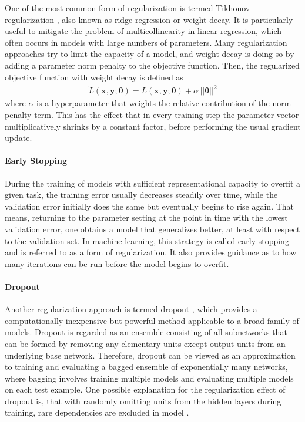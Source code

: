 \documentclass{scrartcl}
\begin{document}
One of the most common  form of regularization is termed Tikhonov regularization \cite{Tikhonov1943}, also known as ridge regression or weight decay. It is particularly useful to mitigate the problem of multicollinearity in linear regression, which often occurs in models with large numbers of parameters. Many regularization approaches try to limit the capacity of a model, and weight decay is doing so by adding a parameter norm penalty to the objective function. Then, the regularized objective function with weight decay is defined as
\begin{align}
\tilde L(\mathbf x, \mathbf y; \boldsymbol \theta) = L(\mathbf x, \mathbf y; \boldsymbol \theta) + \alpha \,||\boldsymbol \theta||^2
\end{align} 
where $\alpha$ is a hyperparameter that weights the relative contribution of the norm penalty term. This has the effect that in every training step the parameter vector multiplicatively shrinks by a constant factor, before performing the usual gradient update. 


\paragraph{Early Stopping} 

During the training of models with sufficient representational capacity to overfit a given task, the training error usually decreases steadily over time, while the validation error initially does the same but eventually begins to rise again. That means, returning to the parameter setting at the point in time with the lowest validation error, one obtains a model that generalizes better, at least with respect to the validation set. In machine learning, this strategy is called early stopping and is referred to as a form of regularization. It also provides guidance as to how many iterations can be run before the model begins to overfit. 



\paragraph{Dropout} Another regularization approach is termed dropout \cite{Srivastava2014}, which provides a computationally inexpensive but powerful method applicable to a broad family of models. Dropout is regarded as an ensemble consisting of all subnetworks that can be formed by removing any elementary units except output units from an underlying base network. Therefore, dropout can be viewed as an approximation to training and evaluating a bagged ensemble of exponentially many networks, where bagging involves training multiple models and evaluating multiple models on each test example. One possible explanation for the re\-gu\-larization effect of dropout is, that with randomly omitting units from the hidden layers during training, rare dependencies are excluded in model \cite{Dahl2013}.
\end{document}
